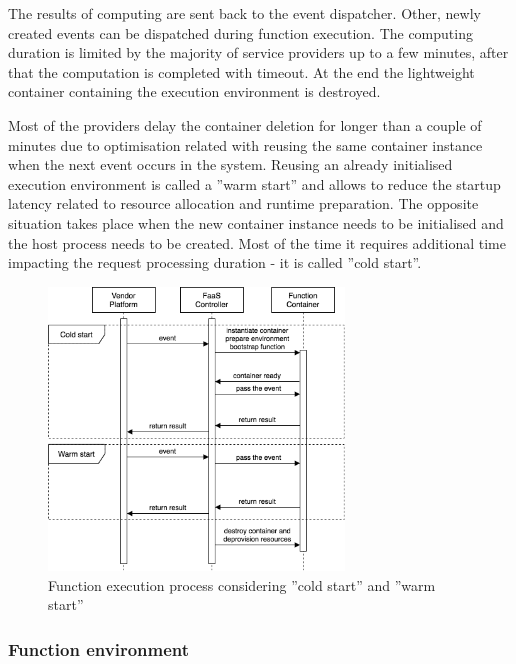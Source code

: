 The results of computing are sent back to the event dispatcher. Other, newly created events can be dispatched during function execution. The computing duration is limited by the majority of service providers up to a few minutes, after that the computation is completed with timeout. At the end the lightweight container containing the execution environment is destroyed.

Most of the providers delay the container deletion for longer than a couple of minutes due to optimisation related with reusing the same container instance when the next event occurs in the system. Reusing an already initialised execution environment is called a ''warm start'' and allows to reduce the startup latency related to resource allocation and runtime preparation. The opposite situation takes place when the new container instance needs to be initialised and the host process needs to be created. Most of the time it requires additional time impacting the request processing duration - it is called ''cold start''.

\begin{figure}[h]
    \centering
    \includegraphics[width=0.7\textwidth]{assets/02-serverless/ServerlessExecution.png}
    \caption{Function execution process considering ''cold start'' and ''warm start''}
    \label{fig:function-execution-process}
\end{figure}


\subsubsection*{Function environment}

